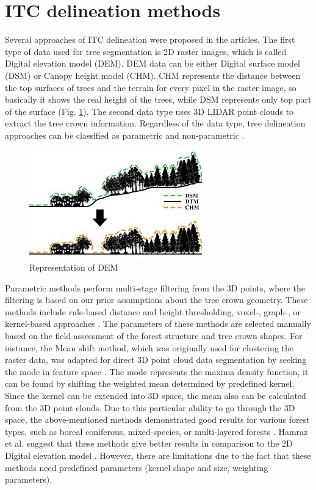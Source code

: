 \section{\gls{ITC} delineation methods}

Several approaches of \gls{ITC} delineation were proposed in the articles. The first type of data used for tree segmentation is 2D raster images, which is called Digital elevation model (\gls{DEM}). \gls{DEM} data can be either Digital surface model (\gls{DSM}) or Canopy height model (\gls{CHM}). \gls{CHM} represents the distance between the top surfaces of trees and the terrain for every pixel in the raster image, so basically it shows the real height of the trees, while \gls{DSM} represents only top part of the surface (Fig. \ref{DEM}). The second data type uses 3D \gls{LIDAR} point clouds to extract the tree crown information. Regardless of the data type, tree delineation approaches can be classified as parametric and non-parametric \cite{Hamraz2016}.

\begin{figure}[ht]
\centering
\includegraphics[scale=1.2]{images/DEM.png}
\caption{Representation of DEM}
\label{DEM}
\end{figure}

Parametric methods perform multi-stage filtering from the 3D points, where the filtering is based on our prior assumptions about the tree crown geometry. These methods include rule-based distance and height thresholding, voxel-, graph-, or kernel-based approaches \cite{Xiao2019}. The parameters of these methods are selected manually based on the field assessment of the forest structure and tree crown shapes. For instance, the Mean shift method, which was originally used for clustering the raster data, was adapted for direct 3D point cloud data segmentation by seeking the mode in feature space \cite{Michel2015}. The mode represents the maxima density function, it can be found by shifting the weighted mean determined by predefined kernel. Since the kernel can be extended into 3D space, the mean also can be calculated from the 3D point clouds. Due to this particular ability to go through the 3D space, the above-mentioned methods demonstrated good results for various forest types, such as boreal coniferous, mixed-species, or multi-layered forests \cite{Xiao2019}. Hamraz et al. suggest that these methods give better results in comparison to the 2D Digital elevation model \cite{Hamraz2016}. However, there are limitations due to the fact that these methods need predefined parameters (kernel shape and size, weighting parameters).

